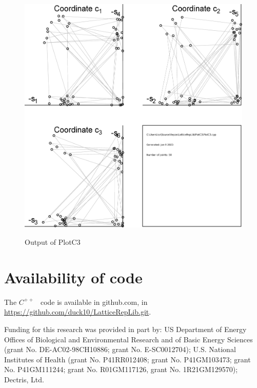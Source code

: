 \documentclass[preprint]{iucr}              %
\numberwithin{equation}{section}
\begin{document}
		
	\begin{figure}
		\includegraphics[width=\textwidth]{PlotC3}
		\label{plotc3}
		\caption{Output of PlotC3}
	\end{figure}
	
	\section{Availability of code}
	
	The $C^{++}$ ~code is available in github.com, in
	\url{https://github.com/duck10/LatticeRepLib.git}.
	
	
	
	
	
	Funding for this research was provided in part by:  
	US Department of Energy Offices of Biological and 
	Environmental Research and of Basic Energy Sciences 
	(grant No. DE-AC02-98CH10886; grant No. E-SC0012704); 
	U.S. National Institutes of Health (grant No. P41RR012408; 
	grant No. P41GM103473; grant No. P41GM111244; 
	grant No. R01GM117126,
	grant No. 1R21GM129570); Dectris, Ltd.
	
	
	
	
	
	
	
	
	
	
\end{document}
